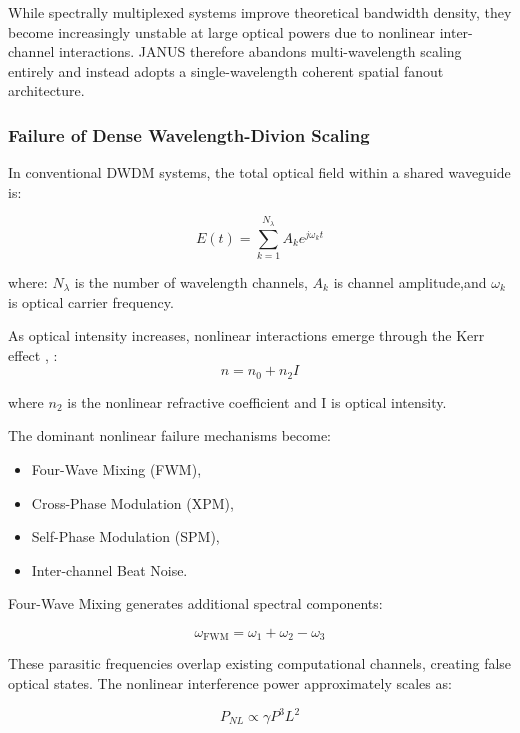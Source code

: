 \documentclass[journal]{IEEEtran}
\begin{document}
While spectrally multiplexed systems improve theoretical bandwidth density, they become increasingly unstable at large optical powers due to nonlinear inter-channel interactions. JANUS therefore abandons multi-wavelength scaling entirely and instead adopts a single-wavelength coherent spatial fanout architecture.

\subsubsection{\textbf{Failure of Dense Wavelength-Divion Scaling}}

In conventional DWDM systems, the total optical field within a shared waveguide is:

\begin{equation}
E(t) = \sum_{k=1}^{N_{\lambda}} A_k e^{j\omega_k t} 
\end{equation}

where: $N_{\lambda}$ is the number of wavelength channels, $A_k$ is channel amplitude,and $\omega_{k}$ is optical carrier frequency.

As optical intensity increases, nonlinear interactions emerge through the Kerr effect \cite{Saleh2019}, \cite{Boyd2020}:
\begin{equation}
n = n_0 + n_2I
\end{equation}

where $n_2$ is the nonlinear refractive coefficient and I is optical intensity.

The dominant nonlinear failure mechanisms become:
\begin{itemize}
\item Four-Wave Mixing (FWM),
\item Cross-Phase Modulation (XPM),
\item Self-Phase Modulation (SPM),
\item Inter-channel Beat Noise.
\end{itemize}

Four-Wave Mixing generates additional spectral components:

\begin{equation}
\omega_{\text{FWM}} = \omega_1 + \omega_2 - \omega_3 
\end{equation}

These parasitic frequencies overlap existing computational channels, creating false optical states. The nonlinear interference power approximately scales as:

\begin{equation}
P_{NL} \propto \gamma P^{3} L^{2}
\end{equation}
\end{document}
